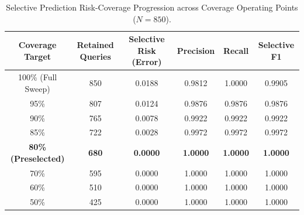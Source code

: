 \begin{table}[t]
\centering
\small
\caption{Selective Prediction Risk-Coverage Progression across Coverage Operating Points ($N=850$).}
\label{tab:selective_abstention}
\begin{tabular}{cccccc}
\toprule
\textbf{Coverage Target} & \textbf{Retained Queries} & \textbf{Selective Risk (Error)} & \textbf{Precision} & \textbf{Recall} & \textbf{Selective F1} \\
\midrule
100\% (Full Sweep) & 850 & 0.0188 & 0.9812 & 1.0000 & 0.9905 \\
95\% & 807 & 0.0124 & 0.9876 & 0.9876 & 0.9876 \\
90\% & 765 & 0.0078 & 0.9922 & 0.9922 & 0.9922 \\
85\% & 722 & 0.0028 & 0.9972 & 0.9972 & 0.9972 \\
\textbf{80\% (Preselected)} & \textbf{680} & \textbf{0.0000} & \textbf{1.0000} & \textbf{1.0000} & \textbf{1.0000} \\
70\% & 595 & 0.0000 & 1.0000 & 1.0000 & 1.0000 \\
60\% & 510 & 0.0000 & 1.0000 & 1.0000 & 1.0000 \\
50\% & 425 & 0.0000 & 1.0000 & 1.0000 & 1.0000 \\
\bottomrule
\end{tabular}
\end{table}
